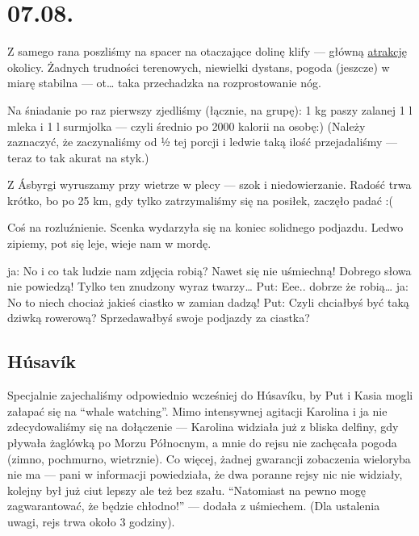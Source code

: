 \chapter*{07.08.}

Z samego rana poszliśmy na spacer na otaczające dolinę klify --- główną \href{http://www.visithusavik.com/attractions/asbyrgi-canyon/}{atrakcję} okolicy. Żadnych trudności terenowych, niewielki dystans, pogoda (jeszcze) w miarę stabilna --- ot… taka przechadzka na rozprostowanie nóg.

Na śniadanie po raz pierwszy zjedliśmy (łącznie, na grupę): 1 kg paszy zalanej 1 l mleka i 1 l surmjolka --- czyli średnio po 2000 kalorii na osobę:) (Należy zaznaczyć, że zaczynaliśmy od ½ tej porcji i ledwie taką ilość przejadaliśmy --- teraz to tak akurat na styk.)


Z Ásbyrgi wyruszamy przy wietrze w plecy --- szok i niedowierzanie. Radość trwa krótko, bo po 25 km, gdy tylko zatrzymaliśmy się na posiłek, zaczęło padać :(

Coś na rozluźnienie. Scenka wydarzyła się na koniec solidnego podjazdu. Ledwo zipiemy, pot się leje, wieje nam w mordę.

ja: No i co tak ludzie nam zdjęcia robią? Nawet się nie uśmiechną! Dobrego słowa nie powiedzą! Tylko ten znudzony wyraz twarzy…
Put: Eee.. dobrze że robią…
ja: No to niech chociaż jakieś ciastko w zamian dadzą!
Put: Czyli chciałbyś być taką dziwką rowerową? Sprzedawałbyś swoje podjazdy za ciastka?

\section*{Húsavík}

Specjalnie zajechaliśmy odpowiednio wcześniej do Húsavíku, by Put i Kasia mogli załapać się na “whale watching”. Mimo intensywnej agitacji Karolina i ja nie zdecydowaliśmy się na dołączenie --- Karolina widziała już z bliska delfiny, gdy pływała żaglówką po Morzu Północnym, a mnie do rejsu nie zachęcała pogoda (zimno, pochmurno, wietrznie). Co więcej, żadnej gwarancji zobaczenia wieloryba nie ma --- pani w informacji powiedziała, że dwa poranne rejsy nic nie widziały, kolejny był już ciut lepszy ale też bez szału. “Natomiast na pewno mogę zagwarantować, że będzie chłodno!” --- dodała z uśmiechem. (Dla ustalenia uwagi, rejs trwa około 3 godziny).

